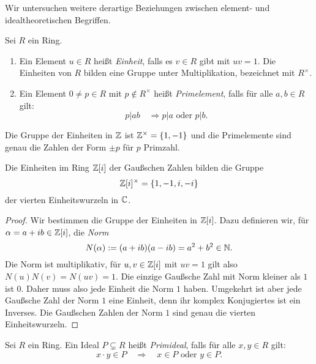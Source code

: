 \documentclass{book}
\begin{document}
Wir untersuchen weitere derartige Beziehungen zwischen element- und idealtheoretischen
Begriffen.

\begin{term}
    \label{term:einheitprim}
    Sei $R$ ein Ring. 
    \begin{enumerate}
        \item {}Ein Element $u \in R$ heißt \emph{Einheit}, falls es $v \in R$
            gibt mit $uv =1$. Die Einheiten von $R$ bilden eine Gruppe unter
            Multiplikation, bezeichnet mit $R^{\times}$. 
        \item {}Ein Element $0 \neq p \in R$ mit $p \notin R^{\times}$ heißt
            \emph{Primelement}, falls für alle $a,b \in R$ gilt: 
            \[
                p|ab \quad \Rightarrow \text{$p|a$ oder $p|b$}. 
            \]
    \end{enumerate}
\end{term}

\begin{exa}
        Die Gruppe der Einheiten in $\mathbb{Z}$ ist $\mathbb{Z}^{\times} = \{1, -1 \}$ und
        die Primelemente sind genau die Zahlen der Form $\pm p$ für $p$
        Primzahl.
\end{exa}

\begin{prop}
    \label{prop:gausseinheiten}
    Die Einheiten im Ring $\mathbb{Z}[i]$ der Gaußschen Zahlen bilden die Gruppe
    \[
        \mathbb{Z}[i]^{\times} = \{1, -1, i, -i \}
    \]
    der vierten Einheitswurzeln in $\mathbb{C}$.
\end{prop}
\begin{proof}
    Wir bestimmen die Gruppe der Einheiten in $\mathbb{Z}[i]$. Dazu definieren wir, für $\alpha = a+ib \in \mathbb{Z}[i]$, die \emph{Norm} 
        \[
            N(\alpha) := (a + i b) (a - i b) = a^2 + b^2 \in \mathbb{N}.
        \]
        Die Norm ist multiplikativ, für $u,v \in \mathbb{Z}[i]$ mit $uv = 1$ gilt
        also $N(u)N(v) = N(uv) = 1$. Die einzige Gaußsche Zahl mit Norm
        kleiner als $1$ ist $0$. Daher muss also jede Einheit die Norm $1$
        haben. Umgekehrt ist aber jede Gaußsche Zahl der Norm $1$ eine
        Einheit, denn ihr komplex Konjugiertes ist ein Inverses. Die Gaußschen
        Zahlen der Norm $1$ sind genau die vierten Einheitswurzeln.
\end{proof}

\begin{defi}
    \label{defi:prim}
    Sei $R$ ein Ring. Ein Ideal $P \subsetneq R$ heißt \emph{Primideal}, falls für alle $x,y \in R$ gilt:
    \[
        x \cdot y \in P \quad \Rightarrow \quad \text{$x \in P$ oder $y \in P$}.
    \]
\end{defi}
\end{document}
